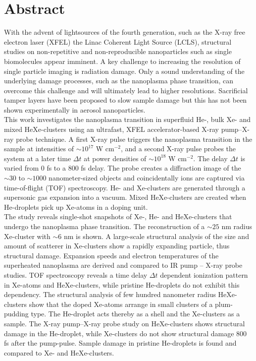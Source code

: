 \section*{Abstract}\label{ch:abstract}
With the advent of lightsources of the fourth generation, such as the X-ray free electron laser (XFEL) the Linac Coherent Light Source (LCLS), structural studies on non-repetitive and non-reproducible nanoparticles such as single biomolecules appear imminent. A key challenge to increasing the resolution of single particle imaging is radiation damage. Only a sound understanding of the underlying damage processes, such as the nanoplasma phase transition, can overcome this challenge and will ultimately lead to higher resolutions. Sacrificial tamper layers have been proposed to slow sample damage but this has not been shown experimentally in aerosol nanoparticles.\\[1\baselineskip]
This work investigates the nanoplasma transition in superfluid He-, bulk Xe- and mixed HeXe-clusters using an ultrafast, XFEL accelerator-based X-ray pump--X-ray probe technique. A first X-ray pulse triggers the nanoplasma transition in the sample at intensities of $\sim 10^{17}$ W cm$^{-2}$, and a second X-ray pulse probes the system at a later time $\Delta t$ at power densities of $\sim 10^{18}$ W cm$^{-2}$. The delay $\Delta t$ is varied from 0 fs to a 800 fs delay. The probe creates a diffraction image of the $\sim 30$ to $\sim 1000$ nanometer-sized objects and coincidentally ions are captured via time-of-flight (TOF) spectroscopy. He- and Xe-clusters are generated through a supersonic gas expansion into a vacuum. Mixed HeXe-clusters are created when He-droplets pick up Xe-atoms in a doping unit.\\[1\baselineskip]
The study reveals single-shot snapshots of Xe-, He- and HeXe-clusters that undergo the nanoplasma phase transition. The reconstruction of a $\sim 25$ nm radius Xe-cluster with $\sim 6$ nm is shown. A large-scale structural analysis of the size and amount of scatterer in Xe-clusters show a rapidly expanding particle, thus structural damage. Expansion speeds and electron temperatures of the superheated nanoplasma are derived and compared to IR pump -- X-ray probe studies. TOF spectroscopy reveals a time delay $\Delta t$ dependent ionization pattern in Xe-atoms and HeXe-clusters, while pristine He-droplets do not exhibit this dependency. The structural analysis of few hundred nanometer radius HeXe-clusters show that the doped Xe-atoms arrange in small clusters of a plum-pudding type. The He-droplet acts thereby as a shell and the Xe-clusters as a sample. The X-ray pump--X-ray probe study on HeXe-clusters shows structural damage in the He-droplet, while Xe-clusters do not show structural damage 800 fs after the pump-pulse. Sample damage in pristine He-droplets is found and compared to Xe- and HeXe-clusters.
%
%
%
%
